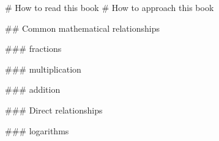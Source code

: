 

# How to read this book
# How to approach this book



## Common mathematical relationships



### fractions


### multiplication


### addition


### Direct relationships


### logarithms